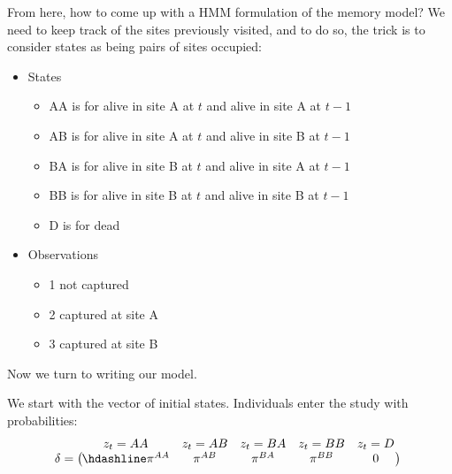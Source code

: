 \documentclass[
  12pt,
]{krantz}
\providecommand{\tightlist}{%
  \setlength{\itemsep}{0pt}\setlength{\parskip}{0pt}}
\begin{document}
From here, how to come up with a HMM formulation of the memory model? We need to keep track of the sites previously visited, and to do so, the trick is to consider states as being pairs of sites occupied:

\begin{itemize}
\tightlist
\item
  States

  \begin{itemize}
  \tightlist
  \item
    AA is for alive in site A at \(t\) and alive in site A at \(t-1\)\\
  \item
    AB is for alive in site A at \(t\) and alive in site B at \(t-1\)\\
  \item
    BA is for alive in site B at \(t\) and alive in site A at \(t-1\)\\
  \item
    BB is for alive in site B at \(t\) and alive in site B at \(t-1\)\\
  \item
    D is for dead
  \end{itemize}
\item
  Observations

  \begin{itemize}
  \tightlist
  \item
    1 not captured\\
  \item
    2 captured at site A\\
  \item
    3 captured at site B
  \end{itemize}
\end{itemize}

Now we turn to writing our model.

We start with the vector of initial states. Individuals enter the study with probabilities:
\[\begin{matrix}
& \\
\mathbf{\delta} =
\left ( \vphantom{ \begin{matrix} 12 \end{matrix} } \right .
\end{matrix}
\hspace{-1.2em}
\begin{matrix}
z_t=AA & z_t=AB & z_t=BA & z_t=BB &z_t=D \\ \hdashline
\pi^{AA} & \pi^{AB} & \pi^{BA} & \pi^{BB} & 0\\
\end{matrix}
\hspace{-0.2em}
\begin{matrix}
& \\
\left . \vphantom{ \begin{matrix} 12 \end{matrix} } \right )
\begin{matrix}
\end{matrix}
\end{matrix}\]
\end{document}
